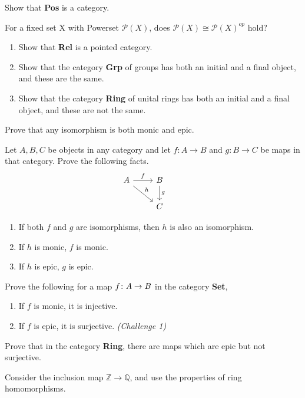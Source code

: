 \begin {exercise}
Show that \textbf{Pos} is a category.
\end{exercise}

\begin{exercise}
For a fixed set X with Powerset $\mathcal{P}(X)$, does $\mathcal{P}(X) \cong \mathcal{P}(X)^{op}$ hold?
\end{exercise}


\begin{exercise}
  \begin{enumerate}
  \item Show that \textbf{Rel} is a pointed category.
  \item Show that the category \textbf{Grp} of groups has both an initial and a final object, and these are the same.
  \item Show that the category \textbf{Ring} of unital rings has both an initial and a final object, and these are not the same.
  \end{enumerate}
\end{exercise}

\begin{exercise}
Prove that any isomorphism is both monic and epic.
\end{exercise}

\newpage

\begin{exercise}
Let $A, B, C$ be objects in any category
  and let $f : A \rightarrow B$ and $g : B \rightarrow C$
  be maps in that category. Prove the following facts.
  \[
    \begin{tikzcd}
      A \arrow{r}{f} \arrow{dr}{h} & B \arrow{d}{g} & \\
                                   & C &
    \end{tikzcd}
  \]

  \begin{enumerate}
  \item If both $f$ and $g$ are isomorphisms,
    then $h$ is also an isomorphism.
  \item If $h$ is monic, $f$ is monic.
  \item If $h$ is epic, $g$ is epic.
  \end{enumerate}
\end{exercise}
\begin{exercise}
  Prove the following for a map $f \from A \to B$
  in the category \textbf{Set},
  \begin{enumerate}
  \item If $f$ is monic, it is injective.
  \item If $f$ is epic, it is surjective. \textit{(Challenge 1)}
  \end{enumerate}
\end{exercise}
\begin{exercise}[Challenge 2]
  Prove that in the category \textbf{Ring}, there are maps
  which are epic but not surjective.
  \begin{hint}
    Consider the inclusion map $\mathbb{Z} \to \mathbb{Q}$, and
    use the properties of ring homomorphisms.
  \end{hint}
\end{exercise}




